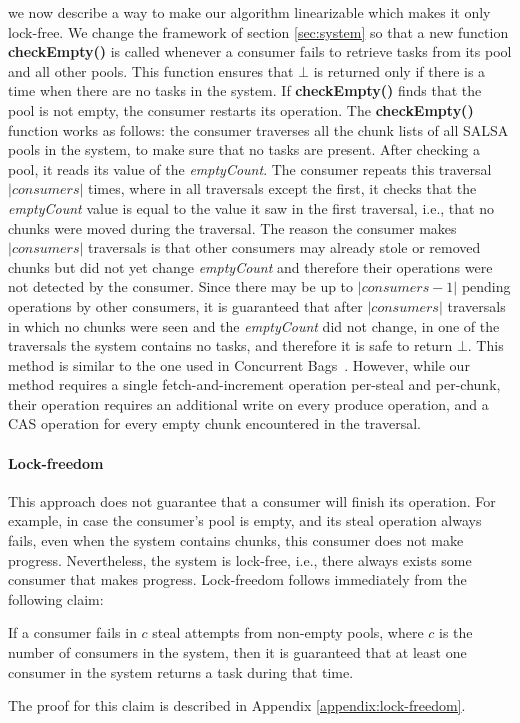 we now describe a way to make our algorithm linearizable which makes it only lock-free. 
We change the framework of section \ref{sec:system} so that a new function {\bf checkEmpty()} is called whenever a consumer fails to retrieve tasks from its pool and all other pools. This function ensures that $\bot$ is returned only if there is a time when there are no tasks in the system. If {\bf checkEmpty()} finds that the pool is not empty, the consumer restarts its operation. The {\bf checkEmpty()} function works as follows: the consumer traverses all the chunk lists of all SALSA pools in the system, to make sure that no tasks are present. After checking a pool, it reads its value of the \emph{emptyCount}. The consumer repeats this traversal $|consumers|$ times, where in all traversals except the first, it checks that the \emph{emptyCount} value is equal to the value it saw in the first traversal, i.e., that no chunks were moved during the traversal. The reason the consumer makes $|consumers|$ traversals is that other consumers may already stole or removed chunks but did not yet change \emph{emptyCount} and therefore their operations were not detected by the consumer. Since there may be up to $|consumers-1|$ pending operations by other consumers, it is guaranteed that after $|consumers|$ traversals in which no chunks were seen and the \emph{emptyCount} did not change, in one of the traversals the system contains no tasks, and therefore it is safe to return $\bot$. This method is similar to the one used in Concurrent Bags~\cite{Sundell:2011:LAC:1989493.1989550}. However, while our method requires a single fetch-and-increment operation per-steal and per-chunk, their operation requires an additional write on every produce operation, and a CAS operation for every empty chunk encountered in the traversal.

\paragraph{Lock-freedom}
This approach does not guarantee that a consumer will finish its operation. For example, in case the consumer's pool is empty, and its steal operation always fails, even when the system contains chunks, this consumer does not make progress. Nevertheless, the system is lock-free, i.e., there always exists some consumer that makes progress. Lock-freedom follows immediately from the following claim:


\begin{claim}
\label{claim:lock-free}
If a consumer fails in $c$ steal attempts from non-empty pools, where $c$ is the number of consumers in the system, then it is guaranteed that at least one consumer in the system returns a task during that time. 
\end{claim}
The proof for this claim is described in Appendix \ref{appendix:lock-freedom}.